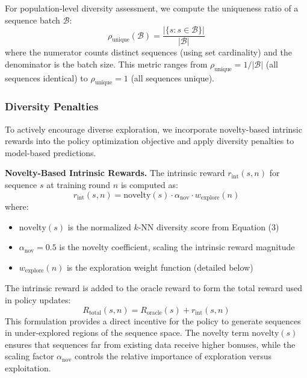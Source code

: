 For population-level diversity assessment, we compute the uniqueness ratio of a sequence batch $\mathcal{B}$:
%
\begin{equation}
\rho_{\text{unique}}(\mathcal{B}) = \frac{|\{s : s \in \mathcal{B}\}|}{|\mathcal{B}|}
\end{equation}
%
where the numerator counts distinct sequences (using set cardinality) and the denominator is the batch size. This metric ranges from $\rho_{\text{unique}} = 1/|\mathcal{B}|$ (all sequences identical) to $\rho_{\text{unique}} = 1$ (all sequences unique).

\subsubsection{Diversity Penalties}

To actively encourage diverse exploration, we incorporate novelty-based intrinsic rewards into the policy optimization objective and apply diversity penalties to model-based predictions.

\textbf{Novelty-Based Intrinsic Rewards.} The intrinsic reward $r_{\text{int}}(s, n)$ for sequence $s$ at training round $n$ is computed as:
%
\begin{equation}
r_{\text{int}}(s, n) = \text{novelty}(s) \cdot \alpha_{\text{nov}} \cdot w_{\text{explore}}(n)
\end{equation}
%
where:
\begin{itemize}
    \item $\text{novelty}(s)$ is the normalized $k$-NN diversity score from Equation (3)
    \item $\alpha_{\text{nov}} = 0.5$ is the novelty coefficient, scaling the intrinsic reward magnitude
    \item $w_{\text{explore}}(n)$ is the exploration weight function (detailed below)
\end{itemize}

The intrinsic reward is added to the oracle reward to form the total reward used in policy updates:
%
\begin{equation}
R_{\text{total}}(s, n) = R_{\text{oracle}}(s) + r_{\text{int}}(s, n)
\end{equation}
%
This formulation provides a direct incentive for the policy to generate sequences in under-explored regions of the sequence space. The novelty term $\text{novelty}(s)$ ensures that sequences far from existing data receive higher bonuses, while the scaling factor $\alpha_{\text{nov}}$ controls the relative importance of exploration versus exploitation.

